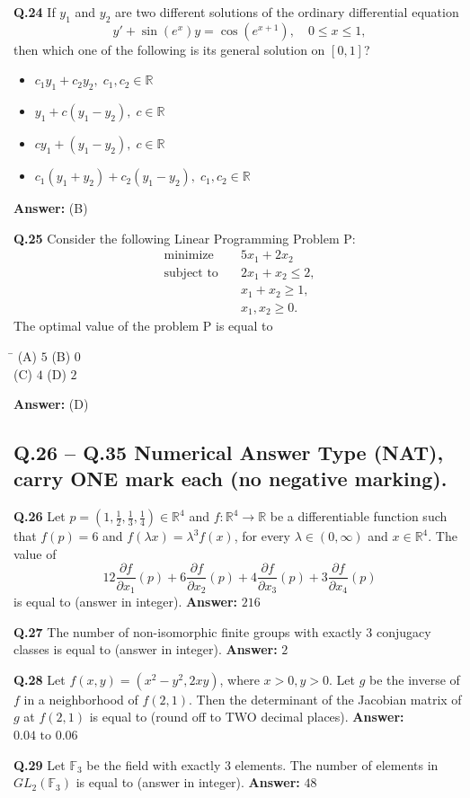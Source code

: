 \documentclass[11pt,a4paper]{article}
\newcommand{\optsfourA}[4]{%
  \begin{tabbing}
    \hspace{0.48\linewidth}\=\kill
    (A) #1 \> (B) #2 \\[2pt]
    (C) #3 \> (D) #4
  \end{tabbing}%
}
\newcommand{\optslistA}[4]{%
  \begin{itemize}
    \setlength{\itemsep}{2pt}\setlength{\parskip}{0pt}
    \item[(A)] #1
    \item[(B)] #2
    \item[(C)] #3
    \item[(D)] #4
  \end{itemize}%
}
\newcommand{\ans}[1]{\textbf{Answer:} #1\par\medskip}
\begin{document}
\textbf{Q.24} If $y_1$ and $y_2$ are two different solutions of the ordinary differential equation
\[
  y' + \sin(e^x) y = \cos(e^{x+1}), \quad 0 \le x \le 1,
\]
then which one of the following is its general solution on $[0, 1]$?
\optslistA{$c_1 y_1 + c_2 y_2, \; c_1, c_2 \in \mathbb{R}$}{$y_1 + c(y_1 - y_2), \; c \in \mathbb{R}$}{$c y_1 + (y_1 - y_2), \; c \in \mathbb{R}$}{$c_1(y_1 + y_2) + c_2(y_1 - y_2), \; c_1, c_2 \in \mathbb{R}$}
\ans{(B)}

\textbf{Q.25} Consider the following Linear Programming Problem P:
\begin{align*}
  \text{minimize} \quad & 5x_1 + 2x_2 \\
  \text{subject to} \quad & 2x_1 + x_2 \le 2, \\
  & x_1 + x_2 \ge 1, \\
  & x_1, x_2 \ge 0.
\end{align*}
The optimal value of the problem P is equal to
\optsfourA{$5$}{$0$}{$4$}{$2$}
\ans{(D)}

\subsection*{Q.26 -- Q.35 Numerical Answer Type (NAT), carry ONE mark each (no negative marking).}

\textbf{Q.26} Let $p = \left(1, \frac{1}{2}, \frac{1}{3}, \frac{1}{4}\right) \in \mathbb{R}^4$ and $f : \mathbb{R}^4 \to \mathbb{R}$ be a differentiable function such that $f(p) = 6$ and $f(\lambda x) = \lambda^3 f(x)$, for every $\lambda \in (0, \infty)$ and $x \in \mathbb{R}^4$. The value of
\[
  12 \frac{\partial f}{\partial x_1}(p) + 6 \frac{\partial f}{\partial x_2}(p) + 4 \frac{\partial f}{\partial x_3}(p) + 3 \frac{\partial f}{\partial x_4}(p)
\]
is equal to \underline{\hspace{2cm}} (answer in integer).
\ans{$216$}

\textbf{Q.27} The number of non-isomorphic finite groups with exactly $3$ conjugacy classes is equal to \underline{\hspace{2cm}} (answer in integer).
\ans{$2$}

\textbf{Q.28} Let $f(x, y) = (x^2 - y^2, 2xy)$, where $x > 0, y > 0$. Let $g$ be the inverse of $f$ in a neighborhood of $f(2, 1)$. Then the determinant of the Jacobian matrix of $g$ at $f(2, 1)$ is equal to \underline{\hspace{2cm}} (round off to TWO decimal places).
\ans{$0.04 \text{ to } 0.06$}

\textbf{Q.29} Let $\mathbb{F}_3$ be the field with exactly $3$ elements. The number of elements in $GL_2(\mathbb{F}_3)$ is equal to \underline{\hspace{2cm}} (answer in integer).
\ans{$48$}
\end{document}
